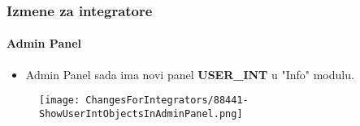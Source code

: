 
\begin{frame}[fragile]
	\frametitle{Izmene za integratore}
	\framesubtitle{Admin Panel}

	\begin{itemize}
		\item Admin Panel sada ima novi panel \textbf{USER\_INT} u "Info" modulu.
	\end{itemize}

	\begin{figure}
		\texttt{[image: ChangesForIntegrators/88441-ShowUserIntObjectsInAdminPanel.png]}
	\end{figure}

\end{frame}


